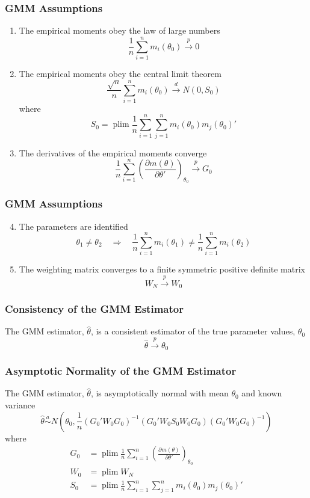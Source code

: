 \documentclass{beamer}
\DeclareMathOperator*{\plim}{plim}
\begin{document}
\begin{frame}\frametitle{GMM Assumptions}
    \begin{enumerate}
    	\item The empirical moments obey the law of large numbers
    	$$\frac{1}{n} \sum_{i = 1}^n m_i(\theta_0) \overset{p}{\rightarrow} 0$$
    	\item The empirical moments obey the central limit theorem
    	$$\frac{\sqrt{n}}{n} \sum_{i = 1}^n m_i(\theta_0) \overset{d}{\rightarrow} N(0, S_0)$$
    	where
    	$$S_0 = \plim \frac{1}{n} \sum_{i = 1}^n \sum_{j = 1}^n m_i(\theta_0) m_j(\theta_0)'$$
    	\item The derivatives of the empirical moments converge
    	$$\frac{1}{n} \sum_{i = 1}^n \left( \frac{\partial m(\theta)}{\partial \theta'} \right)_{\theta_0} \overset{p}{\rightarrow} G_0$$
    \end{enumerate}
\end{frame}

\begin{frame}\frametitle{GMM Assumptions}
    \begin{enumerate}
    	\setcounter{enumi}{3}
    	\item The parameters are identified
    	$$\theta_1 \neq \theta_2 \quad \Rightarrow \quad \frac{1}{n} \sum_{i = 1}^n m_i(\theta_1) \neq \frac{1}{n} \sum_{i = 1}^n m_i(\theta_2)$$
    	\item The weighting matrix converges to a finite symmetric positive definite matrix
    	$$W_N \overset{p}{\rightarrow} W_0$$
    \end{enumerate}
\end{frame}

\begin{frame}\frametitle{Consistency of the GMM Estimator}
    The GMM estimator, $\hat{\theta}$, is a consistent estimator of the true parameter values, $\theta_0$
    $$\hat{\theta} \overset{p}{\rightarrow} \theta_0$$
\end{frame}

\begin{frame}\frametitle{Asymptotic Normality of the GMM Estimator}
    The GMM estimator, $\hat{\theta}$, is asymptotically normal with mean $\theta_0$ and known variance
    $$\hat{\theta} \overset{a}{\sim} N\left( \theta_0, \frac{1}{n} (G_0' W_0 G_0)^{-1} (G_0' W_0 S_0 W_0 G_0) (G_0' W_0 G_0)^{-1} \right)$$
    where
    \begin{align*}
    	G_0 &= \plim \frac{1}{n} \sum_{i = 1}^n \left( \frac{\partial m(\theta)}{\partial \theta'} \right)_{\theta_0} \\
    	W_0 &= \plim W_N \\
    	S_0 &= \plim \frac{1}{n} \sum_{i = 1}^n \sum_{j = 1}^n m_i(\theta_0) m_j(\theta_0)'
    \end{align*}
\end{frame}
\end{document}
